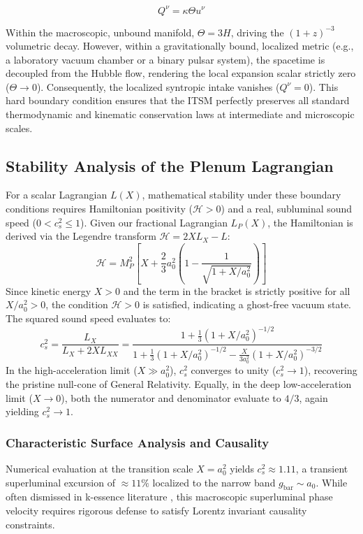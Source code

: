 \documentclass[aps,prd,10pt,twocolumn,superscriptaddress,nofootinbib]{revtex4-2}
\begin{document}
\begin{equation}
Q^\nu = \kappa \Theta u^\nu
\end{equation}

Within the macroscopic, unbound manifold, $\Theta = 3H$, driving the $(1+z)^{-3}$ volumetric decay. However, within a gravitationally bound, localized metric (e.g., a laboratory vacuum chamber or a binary pulsar system), the spacetime is decoupled from the Hubble flow, rendering the local expansion scalar strictly zero ($\Theta \to 0$). Consequently, the localized syntropic intake vanishes ($Q^\nu = 0$). This hard boundary condition ensures that the ITSM perfectly preserves all standard thermodynamic and kinematic conservation laws at intermediate and microscopic scales.

\subsection{Stability Analysis of the Plenum Lagrangian}
For a scalar Lagrangian $L(X)$, mathematical stability under these boundary conditions requires Hamiltonian positivity ($\mathcal{H} > 0$) and a real, subluminal sound speed ($0 < c_s^2 \le 1$). Given our fractional Lagrangian $L_P(X)$, the Hamiltonian is derived via the Legendre transform $\mathcal{H} = 2X L_X - L$:
\begin{equation}
\mathcal{H} = M_P^2 \left[ X + \frac{2}{3}a_0^2 \left( 1 - \frac{1}{\sqrt{1+X/a_0^2}} \right) \right]
\end{equation}
Since kinetic energy $X > 0$ and the term in the bracket is strictly positive for all $X/a_0^2 > 0$, the condition $\mathcal{H} > 0$ is satisfied, indicating a ghost-free vacuum state. The squared sound speed evaluates to:
\begin{equation}
c_s^2 = \frac{L_X}{L_X + 2X L_{XX}} = \frac{1 + \frac{1}{3}(1+X/a_0^2)^{-1/2}}{1 + \frac{1}{3}(1+X/a_0^2)^{-1/2} - \frac{X}{3a_0^2}(1+X/a_0^2)^{-3/2}}
\end{equation}
In the high-acceleration limit ($X \gg a_0^2$), $c_s^2$ converges to unity ($c_s^2 \rightarrow 1$), recovering the pristine null-cone of General Relativity. Equally, in the deep low-acceleration limit ($X \to 0$), both the numerator and denominator evaluate to $4/3$, again yielding $c_s^2 \to 1$.

\subsubsection{Characteristic Surface Analysis and Causality}
Numerical evaluation at the transition scale $X = a_0^2$ yields $c_s^2 \approx 1.11$, a transient superluminal excursion of $\approx 11\%$ localized to the narrow band $g_{\text{bar}} \sim a_0$. While often dismissed in k-essence literature \cite{babichev_cs2}, this macroscopic superluminal phase velocity requires rigorous defense to satisfy Lorentz invariant causality constraints. 
\end{document}
